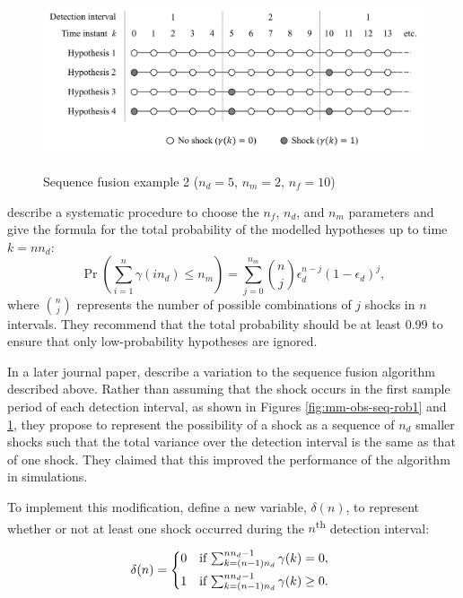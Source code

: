 \begin{figure}[htp]
	\centering
	\includegraphics[height=5.3cm]{images/mm_obs_seq_rob2.pdf}
	\caption{Sequence fusion example 2 ($n_d=5$, $n_m=2$, $n_f=10$)}
	\label{fig:mm-obs-seq-rob2}
\end{figure}

\cite{robertson_detection_1995} describe a systematic procedure to choose the $n_f$, $n_d$, and $n_m$ parameters and give the formula for the total probability of the modelled hypotheses up to time $k=n n_d$:
\begin{equation} \label{eq:p_gamma}
	\operatorname{Pr}\left(\sum_{i=1}^{n} \gamma(i n_d) \leq n_m\right) = \sum_{j=0}^{n_m} \binom{n}{j} \epsilon_d^{n-j}(1-\epsilon_d)^{j},
\end{equation}
where $\binom{n}{j}$ represents the number of possible combinations of $j$ shocks in $n$ intervals. They recommend that the total probability should be at least 0.99 to ensure that only low-probability hypotheses are ignored.

In a later journal paper, \cite{robertson_method_1998} describe a variation to the sequence fusion algorithm described above.  Rather than assuming that the shock occurs in the first sample period of each detection interval, as shown in Figures \ref{fig:mm-obs-seq-rob1} and \ref{fig:mm-obs-seq-rob2}, they propose to represent the possibility of a shock as a sequence of $n_d$ smaller shocks such that the total variance over the detection interval is the same as that of one shock. They claimed that this improved the performance of the algorithm in simulations.

To implement this modification, define a new variable, $\delta(n)$, to represent whether or not at least one shock occurred during the $n$\textsuperscript{th} detection interval:

\begin{equation} \label{eq:deltak}
	\delta(n) = \begin{cases*}
		0 & \text{if} $\sum_{k=(n-1) n_d}^{n n_d - 1} \gamma(k)=0$, \\
		1 & \text{if} $\sum_{k=(n-1) n_d}^{n n_d - 1} \gamma(k)\ge0$.
	\end{cases*}
\end{equation}

